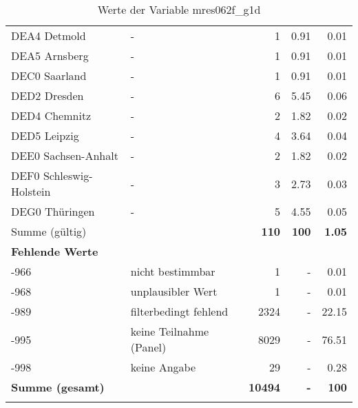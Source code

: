 \begin{longtable}{Xlrrr}
        \multicolumn{1}{X}{DEA4 Detmold} & - & \num{1} & \num[round-mode=places,round-precision=2]{0.91} & \num[round-mode=places,round-precision=2]{0.01} \\
        \multicolumn{1}{X}{DEA5 Arnsberg} & - & \num{1} & \num[round-mode=places,round-precision=2]{0.91} & \num[round-mode=places,round-precision=2]{0.01} \\
        \multicolumn{1}{X}{DEC0 Saarland} & - & \num{1} & \num[round-mode=places,round-precision=2]{0.91} & \num[round-mode=places,round-precision=2]{0.01} \\
        \multicolumn{1}{X}{DED2 Dresden} & - & \num{6} & \num[round-mode=places,round-precision=2]{5.45} & \num[round-mode=places,round-precision=2]{0.06} \\
        \multicolumn{1}{X}{DED4 Chemnitz} & - & \num{2} & \num[round-mode=places,round-precision=2]{1.82} & \num[round-mode=places,round-precision=2]{0.02} \\
        \multicolumn{1}{X}{DED5 Leipzig} & - & \num{4} & \num[round-mode=places,round-precision=2]{3.64} & \num[round-mode=places,round-precision=2]{0.04} \\
        \multicolumn{1}{X}{DEE0 Sachsen-Anhalt} & - & \num{2} & \num[round-mode=places,round-precision=2]{1.82} & \num[round-mode=places,round-precision=2]{0.02} \\
        \multicolumn{1}{X}{DEF0 Schleswig-Holstein} & - & \num{3} & \num[round-mode=places,round-precision=2]{2.73} & \num[round-mode=places,round-precision=2]{0.03} \\
        \multicolumn{1}{X}{DEG0 Thüringen} & - & \num{5} & \num[round-mode=places,round-precision=2]{4.55} & \num[round-mode=places,round-precision=2]{0.05} \\
     \midrule
      \multicolumn{2}{l}{Summe (gültig)} & \textbf{\num{110}} &
      \textbf{\num{100}} &
         \textbf{\num[round-mode=places,round-precision=2]{1.05}} \\
     \multicolumn{5}{l}{\textbf{Fehlende Werte}}\\
       -966 & nicht bestimmbar & \num{1} & - & \num[round-mode=places,round-precision=2]{0.01} \\

       -968 & unplausibler Wert & \num{1} & - & \num[round-mode=places,round-precision=2]{0.01} \\

       -989 & filterbedingt fehlend & \num{2324} & - & \num[round-mode=places,round-precision=2]{22.15} \\

       -995 & keine Teilnahme (Panel) & \num{8029} & - & \num[round-mode=places,round-precision=2]{76.51} \\

       -998 & keine Angabe & \num{29} & - & \num[round-mode=places,round-precision=2]{0.28} \\

     \midrule
     \multicolumn{2}{l}{\textbf{Summe (gesamt)}} & \textbf{\num{10494}} & \textbf{-} & \textbf{\num{100}} \\
     \bottomrule
     \caption{Werte der Variable mres062f\_g1d}
     \end{longtable}
     
